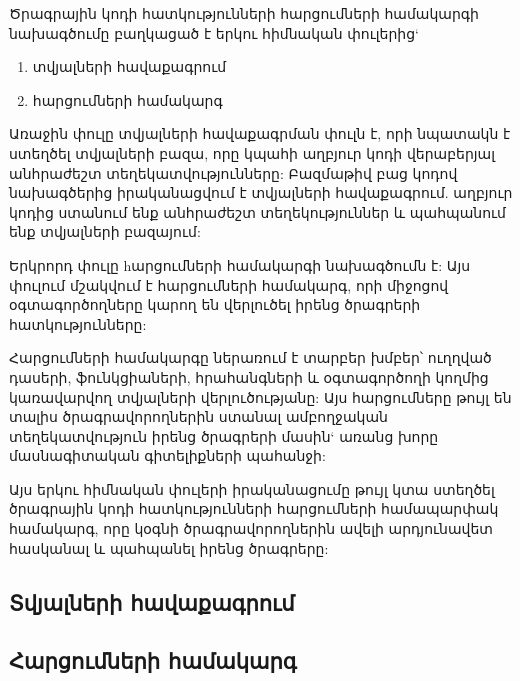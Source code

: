     {
        Ծրագրային կոդի հատկությունների հարցումների համակարգի նախագծումը բաղկացած է երկու հիմնական փուլերից`
        \begin{enumerate}
            \item տվյալների հավաքագրում
            \item հարցումների համակարգ
        \end{enumerate}

        Առաջին փուլը տվյալների հավաքագրման փուլն է, որի նպատակն է ստեղծել տվյալների բազա, որը կպահի աղբյուր կոդի
        վերաբերյալ անհրաժեշտ տեղեկատվությունները:
        Բազմաթիվ բաց կոդով նախագծերից իրականացվում է տվյալների հավաքագրում.
        աղբյուր կոդից ստանում ենք անհրաժեշտ տեղեկություններ
        և պահպանում ենք տվյալների բազայում:

        Երկրորդ փուլը hարցումների համակարգի նախագծումն է: Այս փուլում մշակվում է հարցումների համակարգ, որի միջոցով օգտագործողները կարող են վերլուծել իրենց ծրագրերի հատկությունները:

        Հարցումների համակարգը ներառում է տարբեր խմբեր՝ ուղղված դասերի, ֆունկցիաների, հրահանգների և օգտագործողի կողմից կառավարվող տվյալների վերլուծությանը: Այս հարցումները թույլ են տալիս ծրագրավորողներին ստանալ ամբողջական տեղեկատվություն իրենց ծրագրերի մասին` առանց խորը մասնագիտական գիտելիքների պահանջի:

        Այս երկու հիմնական փուլերի իրականացումը թույլ կտա ստեղծել ծրագրային կոդի հատկությունների հարցումների համապարփակ համակարգ, որը կօգնի ծրագրավորողներին ավելի արդյունավետ հասկանալ և պահպանել իրենց ծրագրերը:

        \subsection{Տվյալների հավաքագրում}\label{subsec:dataCollection}
        

        \subsection{Հարցումների համակարգ}\label{subsec:queries}
        
    }
